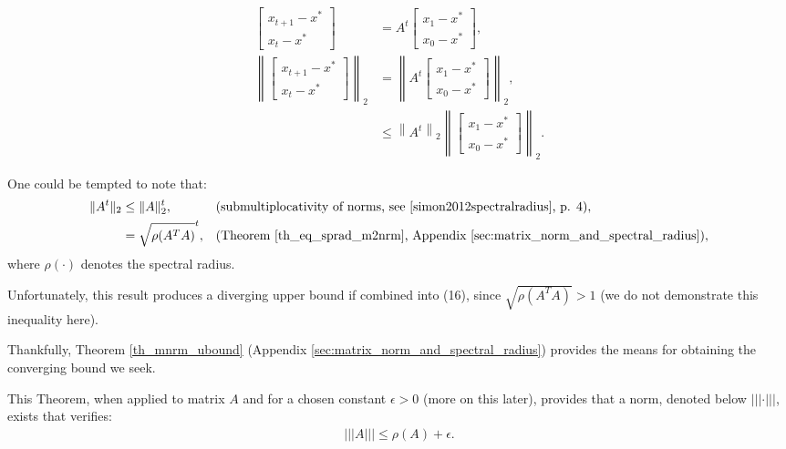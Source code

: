 \documentclass{article}
\begin{document}
\begin{align}
\label{eq:gdwqobiwqd}
\begin{bmatrix}x_{t+1} - x^*\\x_{t} - x^*\end{bmatrix}  &=  A^{t}  \begin{bmatrix}x_{1}- x^*\\x_{0} - x^*\end{bmatrix}, \nonumber \\
\left\lVert  \begin{bmatrix}x_{t+1} - x^*\\x_{t} - x^*\end{bmatrix}  \right\rVert_2 &= \left\lVert A^{t}  \begin{bmatrix}x_{1}- x^*\\x_{0} - x^*\end{bmatrix}  \right\rVert_2, \nonumber \\
					&\leq \left\lVert A^{t}  \right\rVert_2 \left\lVert \begin{bmatrix}x_{1}- x^*\\x_{0} - x^*\end{bmatrix}  \right\rVert_2.
\end{align}
\pagebreak
\par One could be tempted to note that:
\begin{align}
    \|A^t\|_2 &\le\|A\|_2^t, && \text{(submultiplocativity of norms, see \cite{simon2012spectralradius}, p. 4)}, \nonumber \\
            &=\sqrt{\rho(A^TA)}^t, && \text{(Theorem \ref{th_eq_sprad_m2nrm}, Appendix \ref{sec:matrix_norm_and_spectral_radius})}, \nonumber
\end{align}
where $\rho(\cdot)$ denotes the spectral radius.
\\
\par Unfortunately, this result produces a diverging upper bound if combined into (16), since $\sqrt{\rho(A^TA)}>1$ (we do not demonstrate this inequality here).
\\
\par Thankfully, Theorem \ref{th_mnrm_ubound} (Appendix \ref{sec:matrix_norm_and_spectral_radius}) provides the means for obtaining the converging bound we seek.
\\
\par This Theorem, when applied to matrix $A$ and for a chosen constant $\epsilon > 0$ (more on this later),  provides that a norm, denoted below $||| \cdot |||$, exists that verifies:
\begin{align}
	\label{eq:wdojqwqwd}
	|||A||| \le \rho(A) + \epsilon.
\end{align}
\end{document}

